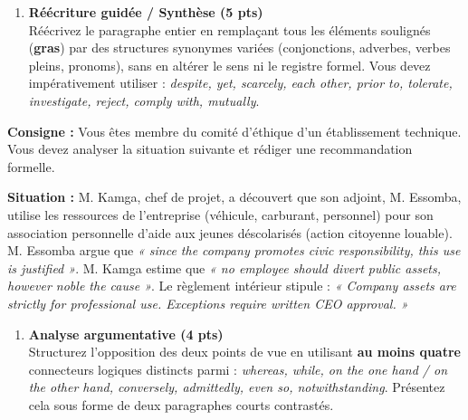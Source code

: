\documentclass[11pt]{article}
\begin{document}
\begin{exercice}
\begin{enumerate}
    \item \textbf{Réécriture guidée / Synthèse (5 pts)} \\
    Réécrivez le paragraphe entier en remplaçant tous les éléments soulignés (\textbf{gras}) par des structures synonymes variées (conjonctions, adverbes, verbes pleins, pronoms), sans en altérer le sens ni le registre formel. Vous devez impérativement utiliser : \textit{despite, yet, scarcely, each other, prior to, tolerate, investigate, reject, comply with, mutually}.
\end{enumerate}
\end{exercice}

\begin{exercice}
\textbf{Consigne :} Vous êtes membre du comité d'éthique d'un établissement technique. Vous devez analyser la situation suivante et rédiger une recommandation formelle.

\textbf{Situation :} M. Kamga, chef de projet, a découvert que son adjoint, M. Essomba, utilise les ressources de l'entreprise (véhicule, carburant, personnel) pour son association personnelle d'aide aux jeunes déscolarisés (action citoyenne louable). M. Essomba argue que \textit{« since the company promotes civic responsibility, this use is justified »}. M. Kamga estime que \textit{« no employee should divert public assets, however noble the cause »}. Le règlement intérieur stipule : \textit{« Company assets are strictly for professional use. Exceptions require written CEO approval. »}

\begin{enumerate}
    \item \textbf{Analyse argumentative (4 pts)} \\
    Structurez l'opposition des deux points de vue en utilisant \textbf{au moins quatre} connecteurs logiques distincts parmi : \textit{whereas, while, on the one hand / on the other hand, conversely, admittedly, even so, notwithstanding}. Présentez cela sous forme de deux paragraphes courts contrastés.


\end{enumerate}
\end{exercice}
\end{document}
